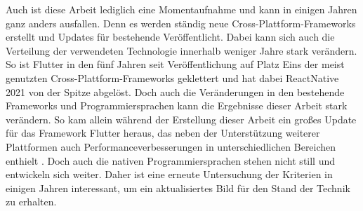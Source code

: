Auch ist diese Arbeit lediglich eine Momentaufnahme und kann in einigen Jahren ganz anders ausfallen. Denn es werden ständig neue Cross-Plattform-Frameworks erstellt und Updates für bestehende Veröffentlicht. Dabei kann sich auch die Verteilung der verwendeten Technologie innerhalb weniger Jahre stark verändern. So ist Flutter in den fünf Jahren seit Veröffentlichung auf Platz Eins der meist genutzten Cross-Plattform-Frameworks geklettert und hat dabei ReactNative 2021 von der Spitze abgelöst. Doch auch die Veränderungen in den bestehende Frameworks und Programmiersprachen kann die Ergebnisse dieser Arbeit stark verändern. So kam allein während der Erstellung dieser Arbeit ein großes Update für das Framework Flutter heraus, das neben der Unterstützung weiterer Plattformen auch Performanceverbesserungen in unterschiedlichen Bereichen enthielt \cite{flutter3}. Doch auch die nativen Programmiersprachen stehen nicht still und entwickeln sich weiter. Daher ist eine erneute Untersuchung der Kriterien in einigen Jahren interessant, um ein aktualisiertes Bild für den Stand der Technik zu erhalten.
